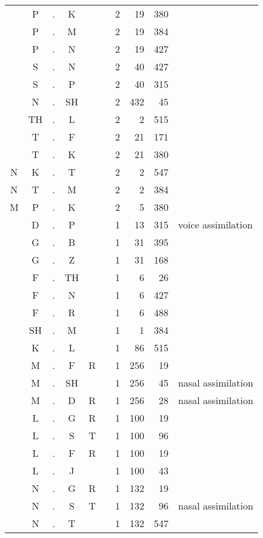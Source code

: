 \begin{center}
\begin{longtable}{c@{ } c@{ } c@{ } c@{ } c@{ } c@{ } r r r l }
  & P  & . & K  &   &   & 2 & 19 & 380 &  \\ 
  & P  & . & M  &   &   & 2 & 19 & 384 &  \\ 
  & P  & . & N  &   &   & 2 & 19 & 427 &  \\ 
  & S  & . & N  &   &   & 2 & 40 & 427 &  \\ 
  & S  & . & P  &   &   & 2 & 40 & 315 &  \\ 
  & N  & . & SH &   &   & 2 & 432 & 45 &  \\ 
  & TH & . & L  &   &   & 2 & 2 & 515 &  \\ 
  & T  & . & F  &   &   & 2 & 21 & 171 &  \\ 
  & T  & . & K  &   &   & 2 & 21 & 380 &  \\ 
N & K  & . & T  &   &   & 2 & 2 & 547 &  \\ 
N & T  & . & M  &   &   & 2 & 2 & 384 &  \\ 
M & P  & . & K  &   &   & 2 & 5 & 380 &  \\ 
  & D  & . & P  &   &   & 1 & 13 & 315 & voice assimilation \\
  & G  & . & B  &   &   & 1 & 31 & 395 &  \\ 
  & G  & . & Z  &   &   & 1 & 31 & 168 &  \\ 
  & F  & . & TH &   &   & 1 & 6 & 26 &  \\ 
  & F  & . & N  &   &   & 1 & 6 & 427 &  \\ 
  & F  & . & R  &   &   & 1 & 6 & 488 &  \\ 
  & SH & . & M  &   &   & 1 & 1 & 384 &  \\ 
  & K  & . & L  &   &   & 1 & 86 & 515 &  \\ 
  & M  & . & F  & R &   & 1 & 256 & 19 &  \\ 
  & M  & . & SH &   &   & 1 & 256 & 45 &  nasal assimilation \\
  & M  & . & D  & R &   & 1 & 256 & 28 & nasal assimilation \\
  & L  & . & G  & R &   & 1 & 100 & 19 &  \\ 
  & L  & . & S  & T &   & 1 & 100 & 96 &  \\ 
  & L  & . & F  & R &   & 1 & 100 & 19 &  \\ 
  & L  & . & J  &   &   & 1 & 100 & 43 &  \\ 
  & N  & . & G  & R &   & 1 & 132 & 19 &  \\ 
  & N  & . & S  & T &   & 1 & 132 & 96 & nasal assimilation \\
  & N  & . & T  &   &   & 1 & 132 & 547 & \\

\end{longtable}
\end{center}
